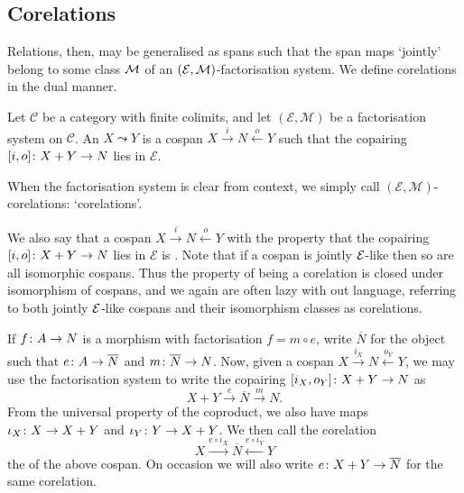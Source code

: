 \subsection{Corelations}
Relations, then, may be generalised as spans such that the span maps `jointly'
belong to some class $\mathcal M$ of an $(\mathcal E,\mathcal M)$-factorisation system. We
define corelations in the dual manner.

\begin{definition}
  Let $\mathcal C$ be a category with finite colimits, and let $(\mathcal E,
  \mathcal M)$ be a factorisation system on $\mathcal C$. An  $X \leadsto Y$ is a cospan $X
  \stackrel{i}\longrightarrow N \stackrel{o}\longleftarrow Y$ such that the
  copairing $[i,o]{\colon} X+Y \to N$ lies in $\mathcal E$.
\end{definition}

When the factorisation system is clear from context, we simply call $(\mathcal
E,\mathcal M)$-corelations: `corelations'.

We also say that a cospan $X \stackrel{i}\longrightarrow N
\stackrel{o}\longleftarrow Y$ with the property that the copairing $[i,o]{\colon} X+Y \to N$ lies in $\mathcal E$ is . Note that
if a cospan is jointly $\mathcal E$-like then so are all isomorphic cospans. Thus the
property of being a corelation is closed under isomorphism of cospans, and we
again are often lazy with out language, referring to both jointly $\mathcal E$-like
cospans and their isomorphism classes as corelations. 

If $f{\colon} A \to N$ is a morphism with factorisation $f = m \circ e$, write
$\overline N$ for the object such that $e{\colon} A \to \overline N$ and $m{\colon}
\overline N \to N$. Now, given a cospan $X \stackrel{i_X}{\longrightarrow} N
\stackrel{o_Y}{\longleftarrow} Y$, we may use the factorisation system to write
the copairing $[i_X,o_Y]{\colon} X+Y \to N$ as
\[
  X+Y \stackrel{e}{\longrightarrow} \overline{N} \stackrel{m}{\longrightarrow}
  N.
\]
From the universal property of the coproduct, we also have maps $\iota_X{\colon} X
\to X+Y$ and $\iota_Y{\colon} Y \to X+Y$. We then call the corelation 
\[
  X \stackrel{e\circ \iota_X}{\longrightarrow} \overline{N} \stackrel{e \circ
  \iota_Y}{\longleftarrow} Y
\]
the  of the above cospan. On occasion we will also
write $e{\colon} X+Y \to \overline N$ for the same corelation.

